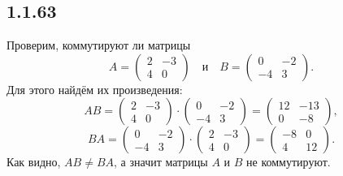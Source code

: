 \subsection{1.1.63}

Проверим, коммутируют ли матрицы
\[
A=
\begin{pmatrix}
	2 & -3 \\
	4 & 0
\end{pmatrix}
\quad\text{и}\quad B=
\begin{pmatrix}
	0 & -2 \\
	-4 & 3
\end{pmatrix}
.
\]
Для этого найдём их произведения:
\[
AB=
\begin{pmatrix}
	2 & -3 \\
	4 & 0
\end{pmatrix}
\cdot
\begin{pmatrix}
	0 & -2 \\
	-4 & 3
\end{pmatrix}
=
\begin{pmatrix}
	12 & -13 \\
	0 & -8
\end{pmatrix}
,
\]
\[
BA=
\begin{pmatrix}
	0 & -2 \\
	-4 & 3
\end{pmatrix}
\cdot
\begin{pmatrix}
	2 & -3 \\
	4 & 0
\end{pmatrix}
=
\begin{pmatrix}
	-8 & 0 \\
	4 & 12
\end{pmatrix}.
\]
Как видно, $AB\neq BA$, а значит матрицы $A$ и $B$ не коммутируют.